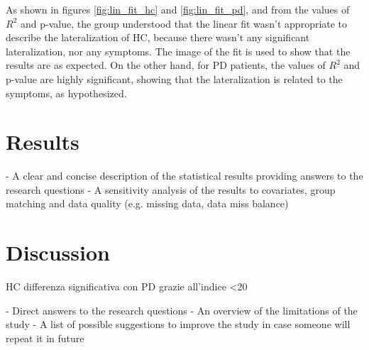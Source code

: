 \documentclass[]{article}
\begin{document}
\begin{multicols}{2}

As shown in figures \ref{fig:lin_fit_hc} and \ref{fig:lin_fit_pd}, and from the values of $R^2$ and p-value, the group understood that the linear fit wasn't appropriate to describe the lateralization of HC, because there wasn't any significant lateralization, nor any symptoms. The image of the fit is used to show that the results are as expected. 
On the other hand, for PD patients, the values of $R^2$ and p-value are highly significant, showing that the lateralization is related to the symptoms, as hypothesized. 



\section{Results}

- A clear and concise description of the statistical results 
providing answers to the research questions
\newline
- A sensitivity analysis of the results to covariates, group matching and data quality (e.g. missing data, data miss balance)

\section{Discussion}

HC differenza significativa con PD grazie all'indice <20 


- Direct answers to the research questions
\newline
- An overview of the limitations of the study
\newline
- A list of possible suggestions to improve the study in case 
someone will repeat it in future

\end{multicols}

\printbibliography
\end{document}
